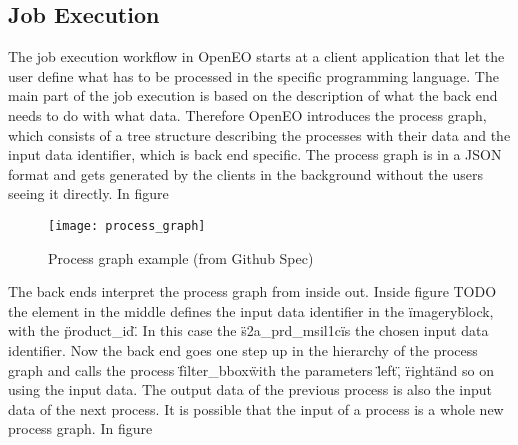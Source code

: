 \documentclass[draft,final]{vutinfth} %
\begin{document}
\subsection{Job Execution}
The job execution workflow in OpenEO starts at a client application that let the user define what has to be processed in the specific programming language.
The main part of the job execution is based on the description of what the back end needs to do with what data. Therefore OpenEO introduces the process graph, which consists of a tree structure describing the processes with their data and the input data identifier, which is back end specific. The process graph is in a JSON format and gets generated by the clients in the background without the users seeing it directly. In figure %

\begin{figure}[h]
	\centering
	\texttt{[image: process\_graph]}
	\caption{Process graph example (from Github Spec)}
	\label{fig:intro} %
\end{figure}

The back ends interpret the process graph from inside out. Inside figure TODO the element in the middle defines the input data identifier in the \"imagery\" block, with the \"product\_id\". In this case the \"s2a\_prd\_msil1c\" is the chosen input data identifier. Now the back end goes one step up in the hierarchy of the process graph and calls the process \"filter\_bbox\" with the parameters \"left\", \"right\" and so on using the input data. The output data of the previous process is also the input data of the next process. It is possible that the input of a process is a whole new process graph. In figure %

\end{document}
